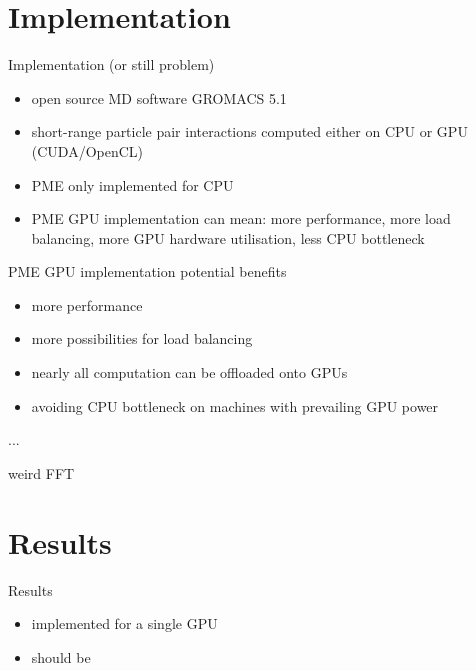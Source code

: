 \documentclass[11pt]{beamer}
\begin{document}

\section{Implementation}
\begin{frame}{Implementation (or still problem)}
\begin{itemize}
\item open source MD software GROMACS 5.1
\item short-range particle pair interactions computed either on CPU or GPU (CUDA/OpenCL)
\item PME only implemented for CPU
\item PME GPU implementation can mean: more performance, more load balancing, more GPU hardware utilisation, less CPU bottleneck 
\end{itemize}
\end{frame}

\begin{frame}{PME GPU implementation potential benefits}
\begin{itemize}
\item more performance
\item more possibilities for load balancing
\item nearly all computation can be offloaded onto GPUs
\item avoiding CPU bottleneck on machines with prevailing GPU power  
\end{itemize}
\end{frame}

\begin{frame}{...}
\end{frame}

\begin{frame}{weird FFT}
\end{frame}

\section{Results}
\begin{frame}{Results}
\begin{itemize}
\item implemented for a single GPU
\item should be
\end{itemize}
\end{frame}
\end{document}
